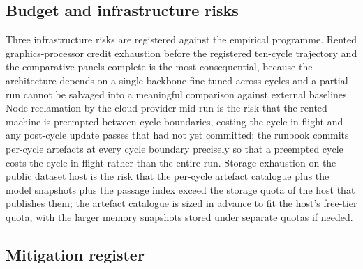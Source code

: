 \subsection{Budget and infrastructure risks}
\label{sec:risk-budget}

Three infrastructure risks are registered against the empirical programme. Rented graphics-processor credit exhaustion before the registered ten-cycle trajectory and the comparative panels complete is the most consequential, because the architecture depends on a single backbone fine-tuned across cycles and a partial run cannot be salvaged into a meaningful comparison against external baselines. Node reclamation by the cloud provider mid-run is the risk that the rented machine is preempted between cycle boundaries, costing the cycle in flight and any post-cycle update passes that had not yet committed; the runbook commits per-cycle artefacts at every cycle boundary precisely so that a preempted cycle costs the cycle in flight rather than the entire run. Storage exhaustion on the public dataset host is the risk that the per-cycle artefact catalogue plus the model snapshots plus the passage index exceed the storage quota of the host that publishes them; the artefact catalogue is sized in advance to fit the host's free-tier quota, with the larger memory snapshots stored under separate quotas if needed.

\subsection{Mitigation register}
\label{sec:risk-mitigation}

